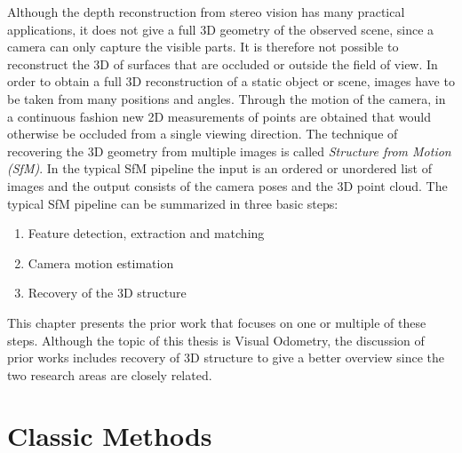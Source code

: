 	Although the depth reconstruction from stereo vision has many practical applications, it does not give a full 3D geometry of the observed scene, since a camera can only capture the visible parts.
	It is therefore not possible to reconstruct the 3D of surfaces that are occluded or outside the field of view. 
	In order to obtain a full 3D reconstruction of a static object or scene, images have to be taken from many positions and angles.
	Through the motion of the camera, in a continuous fashion new 2D measurements of points are obtained that would otherwise be occluded from a single viewing direction.
	The technique of recovering the 3D geometry from multiple images is called \emph{Structure from Motion (SfM)}.
	In the typical SfM pipeline the input is an ordered or unordered list of images and the output consists of the camera poses and the 3D point cloud.
	The typical SfM pipeline can be summarized in three basic steps:
	\begin{enumerate}
		\item Feature detection, extraction and matching
		\item Camera motion estimation
		\item Recovery of the 3D structure
	\end{enumerate}
	This chapter presents the prior work that focuses on one or multiple of these steps.
	Although the topic of this thesis is Visual Odometry, the discussion of prior works includes recovery of 3D structure to give a better overview since the two research areas are closely related. 
	
%	
%	

	\section{Classic Methods}
	
